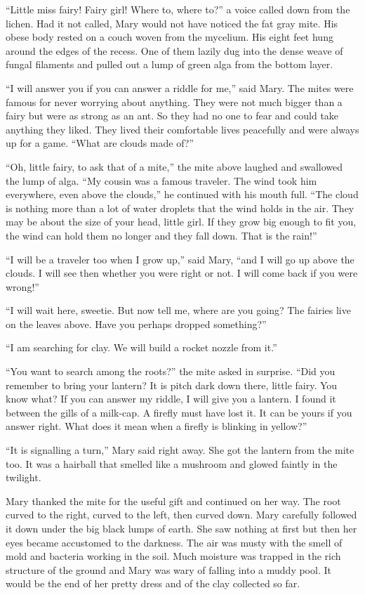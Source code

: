 \documentclass[10pt, draft]{memoir}
\begin{document}
``Little miss fairy! Fairy girl! Where to, where to?'' a voice called down from
the lichen. Had it not called, Mary would not have noticed the fat gray mite.
His obese body rested on a couch woven from the mycelium. His eight feet hung
around the edges of the recess. One of them lazily dug into the dense weave of
fungal filaments and pulled out a lump of green alga from the bottom layer.

``I will answer you if you can answer a riddle for me,'' said Mary. The mites
were famous for never worrying about anything. They were not much bigger than a
fairy but were as strong as an ant. So they had no one to fear and could take
anything they liked. They lived their comfortable lives peacefully and were
always up for a game. ``What are clouds made of?''

``Oh, little fairy, to ask that of a mite,'' the mite above laughed and
swallowed the lump of alga. ``My cousin was a famous traveler. The wind took
him everywhere, even above the clouds,'' he continued with his mouth full.
``The cloud is nothing more than a lot of water droplets that the wind holds in
the air. They may be about the size of your head, little girl. If they grow big
enough to fit you, the wind can hold them no longer and they fall down. That is
the rain!''

``I will be a traveler too when I grow up,'' said Mary, ``and I will go up
above the clouds. I will see then whether you were right or not. I will come
back if you were wrong!''

``I will wait here, sweetie. But now tell me, where are you going? The fairies
live on the leaves above. Have you perhaps dropped something?''

``I am searching for clay. We will build a rocket nozzle from it.''

``You want to search among the roots?'' the mite asked in surprise. ``Did you
remember to bring your lantern? It is pitch dark down there, little fairy. You
know what? If you can answer my riddle, I will give you a lantern. I found it
between the gills of a milk-cap. A firefly must have lost it. It can be yours
if you answer right. What does it mean when a firefly is blinking in yellow?''

``It is signalling a turn,'' Mary said right away. She got the lantern from the
mite too. It was a hairball that smelled like a mushroom and glowed faintly in
the twilight.

Mary thanked the mite for the useful gift and continued on her way. The root
curved to the right, curved to the left, then curved down. Mary carefully
followed it down under the big black lumps of earth. She saw nothing at first
but then her eyes became accustomed to the darkness. The air was musty with the
smell of mold and bacteria working in the soil. Much moisture was trapped in
the rich structure of the ground and Mary was wary of falling into a muddy
pool. It would be the end of her pretty dress and of the clay collected so far.
\end{document}
